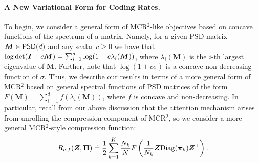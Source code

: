 \documentclass[../../book-main.tex]{subfiles}
\begin{document}
 

\paragraph{A New Variational Form for Coding Rates.} To begin, we consider a general form of MCR$^2$-like objectives based on concave functions of the spectrum of a matrix.  Namely, for a given PSD matrix $\bm M \in \mathsf{PSD}(d)$ and any scalar $c \geq 0$ we have that $\log \det (\bm{I} + c \bm M) = \sum_{i=1}^{d} \log( 1 + c \lambda_i(\bm M))$, where $\lambda_i (\bm M)$ is the $i$-th largest eigenvalue of $\bm M$.  Further, note that $\log(1 + c \sigma)$ is a concave non-decreasing function of $\sigma$.  Thus, we describe our results in terms of a more general form of MCR$^2$ based on general spectral functions of PSD matrices of the form $F(\bm M) = \sum_{i=1}^{d} f(\lambda_i(\bm M))$, where $f$ is concave and non-decreasing.  In particular, recall from our above discussion that the attention mechanism arises from unrolling the compression component of MCR$^2$, so we consider a more general MCR$^2$-style compression function:
\vspace{-2mm}
\begin{equation}
    R_{c,f}(\bm Z, \bm \Pi) \doteq \frac{1}{2}\sum_{k=1}^K \frac{N_k}{N} F\left( \frac{1}{N_k}\bm{Z} \mathrm{Diag}(\bm \pi_k) \bm{Z}^{\top} \right).
    \label{eq:mcr_c_gen}
\end{equation}
\end{document}
